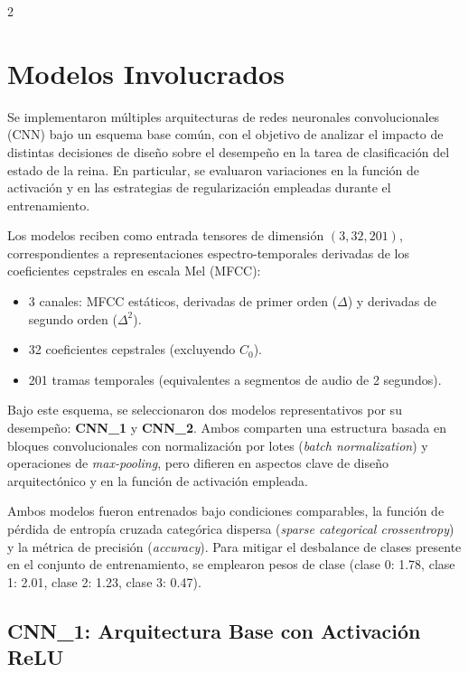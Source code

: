 \documentclass[12pt]{report}
\newenvironment{tightmulticols}{%
  \begin{multicols}{2}
  \setlength{\parskip}{1.2pt}
  \linespread{1}\selectfont
}{%
  \end{multicols}
}
\begin{document}
\pagebreak

\begin{tightmulticols}

\section{Modelos Involucrados}
\label{sec:ModelosInvolucrados}

\noindent Se implementaron múltiples arquitecturas de redes neuronales convolucionales (CNN) bajo un esquema base común, con el objetivo de analizar el impacto de distintas decisiones de diseño sobre el desempeño en la tarea de clasificación del estado de la reina. En particular, se evaluaron variaciones en la función de activación y en las estrategias de regularización empleadas durante el entrenamiento.

\par Los modelos reciben como entrada tensores de dimensión $(3, 32, 201)$, correspondientes a representaciones espectro-temporales derivadas de los coeficientes cepstrales en escala Mel (MFCC):
\begin{itemize}
    \item 3 canales: MFCC estáticos, derivadas de primer orden ($\Delta$) y derivadas de segundo orden ($\Delta^2$).
    \item 32 coeficientes cepstrales (excluyendo $C_0$).
    \item 201 tramas temporales (equivalentes a segmentos de audio de 2 segundos).
\end{itemize}

\par Bajo este esquema, se seleccionaron dos modelos representativos por su desempeño: \textbf{CNN\_1} y \textbf{CNN\_2}. Ambos comparten una estructura basada en bloques convolucionales con normalización por lotes (\textit{batch normalization}) y operaciones de \textit{max-pooling}, pero difieren en aspectos clave de diseño arquitectónico y en la función de activación empleada.

\par Ambos modelos fueron entrenados bajo condiciones comparables, la función de pérdida de entropía cruzada categórica dispersa (\textit{sparse categorical crossentropy}) y la métrica de precisión (\textit{accuracy}). Para mitigar el desbalance de clases presente en el conjunto de entrenamiento, se emplearon pesos de clase (clase 0: 1.78, clase 1: 2.01, clase 2: 1.23, clase 3: 0.47).

\subsection{CNN\_1: Arquitectura Base con Activación ReLU}


\end{tightmulticols}
\end{document}
